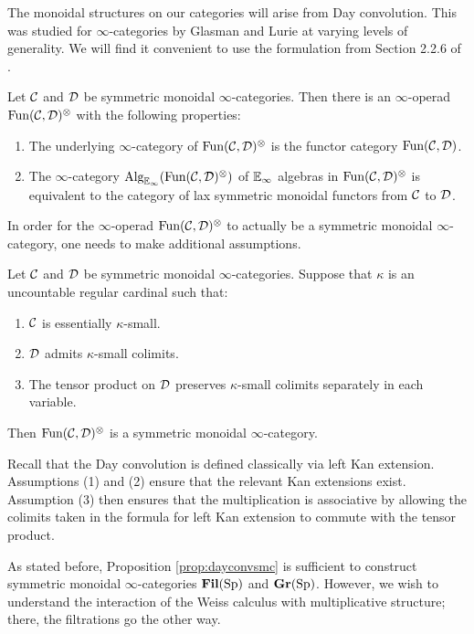 The monoidal structures on our categories will arise from Day convolution.  This was studied for $\infty$-categories by Glasman \cite{Glasman} and Lurie \cite{LurieRot, HA} at varying levels of generality.  We will find it convenient to use the formulation from Section 2.2.6 of \cite{HA}.  

\begin{thm}
Let $\operatorname{\mathcal{C}}$ and $\operatorname{\mathcal{D}}$ be symmetric monoidal $\infty$-categories.  Then there is an $\infty$-operad $\operatorname{\text{Fun}}(\operatorname{\mathcal{C}}, \operatorname{\mathcal{D}})^{\otimes} $ with the following properties:
\begin{enumerate}
\item The underlying $\infty$-category of $\operatorname{\text{Fun}}(\operatorname{\mathcal{C}},\operatorname{\mathcal{D}})^{\otimes}$ is the functor category $\operatorname{\text{Fun}}(\operatorname{\mathcal{C}}, \operatorname{\mathcal{D}})$.
\item The $\infty$-category $\operatorname{\text{Alg}}_{\operatorname{\mathbb{E}}_\infty}(\operatorname{\text{Fun}}(\operatorname{\mathcal{C}}, \operatorname{\mathcal{D}})^{\otimes})$ of $\operatorname{\mathbb{E}}_\infty$ algebras in $\operatorname{\text{Fun}}(\operatorname{\mathcal{C}},\operatorname{\mathcal{D}})^{\otimes}$ is equivalent to the category of lax symmetric monoidal functors from $\operatorname{\mathcal{C}}$ to $\operatorname{\mathcal{D}}$.  

\end{enumerate}
\end{thm}

In order for the $\infty$-operad $\operatorname{\text{Fun}}(\operatorname{\mathcal{C}},\operatorname{\mathcal{D}})^{\otimes}$ to actually be a symmetric monoidal $\infty$-category, one needs to make additional assumptions.  

\begin{prop}\label{prop:dayconvsmc}
Let $\operatorname{\mathcal{C}}$ and $\operatorname{\mathcal{D}}$ be symmetric monoidal $\infty$-categories.  Suppose that $\kappa$ is an uncountable regular cardinal such that:
\begin{enumerate}
\item $\operatorname{\mathcal{C}}$ is essentially $\kappa$-small.
\item $\operatorname{\mathcal{D}}$ admits $\kappa$-small colimits.
\item The tensor product on $\operatorname{\mathcal{D}}$ preserves $\kappa$-small colimits separately in each variable.  
\end{enumerate}
Then $\operatorname{\text{Fun}}(\operatorname{\mathcal{C}},\operatorname{\mathcal{D}})^{\otimes}$ is a symmetric monoidal $\infty$-category.  
\end{prop}

Recall that the Day convolution is defined classically via left Kan extension.  Assumptions (1) and (2) ensure that the relevant Kan extensions exist.  Assumption (3) then ensures that the multiplication is associative by allowing the colimits taken in the formula for left Kan extension to commute with the tensor product.  

As stated before, Proposition \ref{prop:dayconvsmc} is sufficient to construct symmetric monoidal $\infty$-categories $\operatorname{\textbf{Fil}}(\operatorname{\text{Sp}})$ and $\operatorname{\textbf{Gr}}(\operatorname{\text{Sp}})$.  However, we wish to understand the interaction of the Weiss calculus with multiplicative structure; there, the filtrations go the other way.

